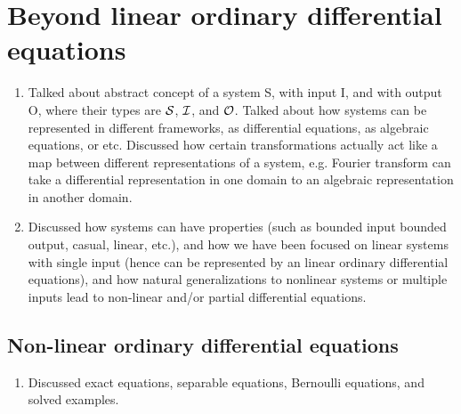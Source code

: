 \chapter{Beyond linear ordinary differential equations}
\begin{enumerate}
	\item Talked about abstract concept of a system S, with input I, and with output O, where their types are $\mathcal{S}$, $\mathcal{I}$, and $\mathcal{O}$. Talked about how systems can be represented in different frameworks, as differential equations, as algebraic equations, or etc. Discussed how certain transformations actually act like a map between different representations of a system, e.g. Fourier transform can take a differential representation in one domain to an algebraic representation in another domain.
	\item Discussed how systems can have properties (such as bounded input bounded output, casual, linear, etc.), and how we have been focused on linear systems with single input (hence can be represented by an linear ordinary differential equations), and how natural generalizations to nonlinear systems or multiple inputs lead to non-linear and/or partial differential equations.
\end{enumerate}
\section{Non-linear ordinary differential equations}
\begin{enumerate}
	\item Discussed exact equations, separable equations, Bernoulli equations, and solved examples.
\end{enumerate}
